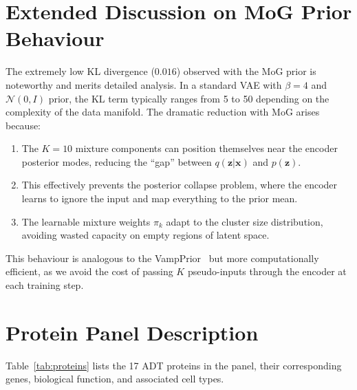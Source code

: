 \documentclass[11pt,a4paper]{article}
\newcommand{\bx}{\mathbf{x}}
\newcommand{\bz}{\mathbf{z}}
\begin{document}
\section{Extended Discussion on MoG Prior Behaviour}\label{app:mog_discussion}

The extremely low KL divergence ($0.016$) observed with the MoG prior is noteworthy and merits detailed analysis.
In a standard VAE with $\beta=4$ and $\mathcal{N}(0,I)$ prior, the KL term typically ranges from 5 to 50 depending on the complexity of the data manifold.
The dramatic reduction with MoG arises because:

\begin{enumerate}[leftmargin=*]
  \item The $K=10$ mixture components can position themselves near the encoder posterior modes, reducing the ``gap'' between $q(\bz|\bx)$ and $p(\bz)$.
  \item This effectively prevents the posterior collapse problem, where the encoder learns to ignore the input and map everything to the prior mean.
  \item The learnable mixture weights $\pi_k$ adapt to the cluster size distribution, avoiding wasted capacity on empty regions of latent space.
\end{enumerate}

This behaviour is analogous to the VampPrior~\citep{tomczak2018} but more computationally efficient, as we avoid the cost of passing $K$ pseudo-inputs through the encoder at each training step.

\section{Protein Panel Description}\label{app:proteins}

Table~\ref{tab:proteins} lists the 17 ADT proteins in the panel, their corresponding genes, biological function, and associated cell types.
\end{document}
